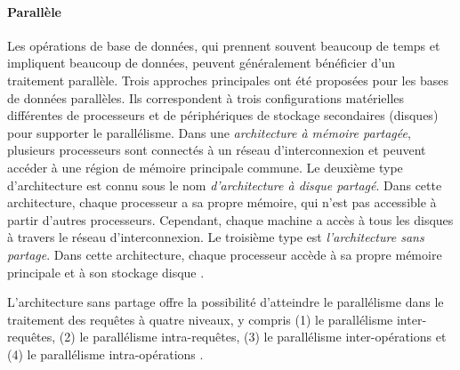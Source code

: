 \paragraph{Parallèle}
Les opérations de base de données, qui prennent souvent beaucoup de temps et impliquent beaucoup de données, peuvent généralement bénéficier d'un traitement parallèle. Trois approches principales ont été proposées pour les bases de données parallèles. Ils correspondent à trois configurations matérielles différentes de processeurs et de périphériques de stockage secondaires (disques) pour supporter le parallélisme. Dans une \textit{architecture à mémoire partagée}, plusieurs processeurs sont connectés à un réseau d'interconnexion et peuvent accéder à une région de mémoire principale commune. Le deuxième type d'architecture est connu sous le nom \textit{d'architecture à disque partagé}. Dans cette architecture, chaque processeur a sa propre mémoire, qui n'est pas accessible à partir d'autres processeurs. Cependant, chaque machine a accès à tous les disques à travers le réseau d'interconnexion. Le troisième type est \textit{l'architecture sans partage}. Dans cette architecture, chaque processeur accède à sa propre mémoire principale et à son stockage disque \cite{Taniar08}.

L'architecture sans partage offre la possibilité d'atteindre le parallélisme dans le traitement des requêtes à quatre niveaux, y compris (1) le parallélisme inter-requêtes, (2) le parallélisme intra-requêtes, (3) le parallélisme inter-opérations et (4) le parallélisme intra-opérations \cite{Ozsu11}.

